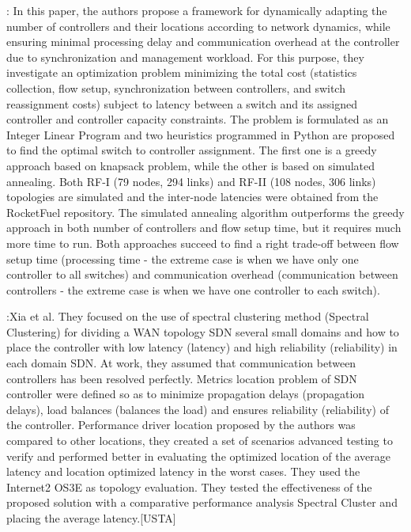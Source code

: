 \documentclass[a4paper,10pt]{article}
\begin{document}
\cite{BaRo13}: In this paper, the authors propose a framework for dynamically adapting the number of controllers and their locations according to network dynamics, while ensuring minimal processing delay and communication overhead at the controller due to synchronization and management workload. For this purpose, they investigate an optimization problem minimizing the total cost (statistics collection, flow setup, synchronization between controllers, and switch reassignment costs) subject to latency between a switch and its assigned controller and controller capacity constraints. The problem is formulated as an Integer Linear Program and two heuristics programmed in Python are proposed to find the optimal switch to controller assignment. The first one is a greedy approach based on knapsack problem, while the other is based on simulated annealing.  Both RF-I  (79 nodes, 294 links) and RF-II (108 nodes, 306 links) topologies are simulated and the inter-node latencies were obtained from the RocketFuel repository. The simulated annealing algorithm outperforms the greedy approach in both number of controllers and flow setup time, but it requires much more time to run. Both approaches succeed to find a right trade-off between flow setup time (processing time - the extreme case is when we have only one controller to all switches) and communication overhead (communication between controllers - the extreme case is when we have one controller to each switch). 

\cite{XiQu14}:Xia et al. They focused on the use of spectral clustering method (Spectral Clustering) for dividing a WAN topology SDN several small domains and how to place the controller with low latency (latency) and high reliability (reliability) in each domain SDN. At work, they assumed that communication between controllers has been resolved perfectly. Metrics location problem of SDN controller were defined so as to minimize propagation delays (propagation delays), load balances (balances the load) and ensures reliability (reliability) of the controller.
Performance driver location proposed by the authors was compared to other locations, they created a set of scenarios advanced testing to verify and performed better in evaluating the optimized location of the average latency and location optimized latency in the worst cases. They used the Internet2 OS3E as topology evaluation.
They tested the effectiveness of the proposed solution with a comparative performance analysis Spectral Cluster and placing the average latency.[USTA]
\end{document}
